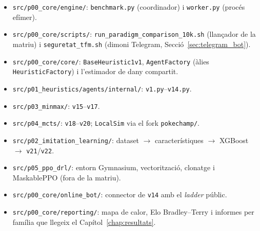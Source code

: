 \begin{itemize}
    \item \texttt{src/p00\_core/engine/}: \texttt{benchmark.py} (coordinador) i \texttt{worker.py} (procés efímer).
    \item \texttt{src/p00\_core/scripts/}: \texttt{run\_paradigm\_comparison\_10k.sh} (llançador de la matriu) i \texttt{seguretat\_tfm.sh} (dimoni Telegram, Secció~\ref{sec:telegram_bot}).
    \item \texttt{src/p00\_core/core/}: \texttt{BaseHeuristic1v1}, \texttt{AgentFactory} (àlies \texttt{HeuristicFactory}) i l'estimador de dany compartit.
    \item \texttt{src/p01\_heuristics/agents/internal/}: \texttt{v1.py}--\texttt{v14.py}.
    \item \texttt{src/p03\_minmax/}: \texttt{v15}--\texttt{v17}.
    \item \texttt{src/p04\_mcts/}: \texttt{v18}--\texttt{v20}; \texttt{LocalSim} via el fork \texttt{pokechamp/}.
    \item \texttt{src/p02\_imitation\_learning/}: dataset $\rightarrow$ característiques $\rightarrow$ XGBoost $\rightarrow$ \texttt{v21}/\texttt{v22}.
    \item \texttt{src/p05\_ppo\_drl/}: entorn Gymnasium, vectorització, clonatge i MaskablePPO (fora de la matriu).
    \item \texttt{src/p00\_core/online\_bot/}: connector de \texttt{v14} amb el \emph{ladder} públic.
    \item \texttt{src/p00\_core/reporting/}: mapa de calor, Elo Bradley--Terry i informes per família que llegeix el Capítol~\ref{chap:resultats}.
\end{itemize}

